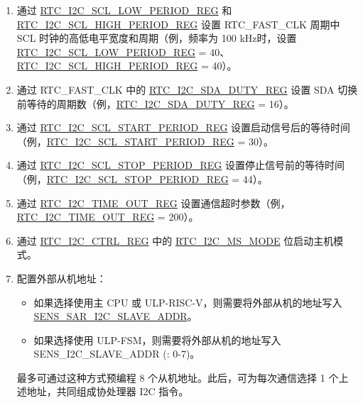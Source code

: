 \documentclass[main\_\_CN.tex]{subfiles}
\begin{document}
\begin{enumerate}
    \item 通过 \hyperref[fielddesc:RTCI2CSCLLOWPERIODREG]{RTC\_I2C\_SCL\_LOW\_PERIOD\_REG} 和 \hyperref[fielddesc:RTCI2CSCLHIGHPERIODREG]{RTC\_I2C\_SCL\_HIGH\_PERIOD\_REG} 设置 RTC\_FAST\_CLK 周期中 SCL 时钟的高低电平宽度和周期（例，频率为 100 kHz时，设置 \hyperref[fielddesc:RTCI2CSCLLOWPERIODREG]{RTC\_I2C\_SCL\_LOW\_PERIOD\_REG} = 40、 \hyperref[fielddesc:RTCI2CSCLHIGHPERIODREG]{RTC\_I2C\_SCL\_HIGH\_PERIOD\_REG} = 40）。

    \item 通过 RTC\_FAST\_CLK 中的 \hyperref[regdesc:RTCI2CSDADUTYREG]{RTC\_I2C\_SDA\_DUTY\_REG} 设置 SDA 切换前等待的周期数（例，\hyperref[regdesc:RTCI2CSDADUTYREG]{RTC\_I2C\_SDA\_DUTY\_REG} = 16）。

    \item 通过 \hyperref[regdesc:RTCI2CSCLSTARTPERIODREG]{RTC\_I2C\_SCL\_START\_PERIOD\_REG} 设置启动信号后的等待时间（例，\hyperref[regdesc:RTCI2CSCLSTARTPERIODREG]{RTC\_I2C\_SCL\_START\_PERIOD\_REG} = 30）。

    \item 通过 \hyperref[regdesc:RTCI2CSCLSTOPPERIODREG]{RTC\_I2C\_SCL\_STOP\_PERIOD\_REG} 设置停止信号前的等待时间（例，\hyperref[regdesc:RTCI2CSCLSTOPPERIODREG]{RTC\_I2C\_SCL\_STOP\_PERIOD\_REG} = 44）。

    \item 通过 \hyperref[fielddesc:RTCI2CTIMEOUTREG]{RTC\_I2C\_TIME\_OUT\_REG} 设置通信超时参数（例，\hyperref[fielddesc:RTCI2CTIMEOUTREG]{RTC\_I2C\_TIME\_OUT\_REG} = 200）。

    \item 通过 \hyperref[regdesc:RTCI2CCTRLREG]{RTC\_I2C\_CTRL\_REG} 中的 \hyperref[fielddesc:RTCI2CMSMODE]{RTC\_I2C\_MS\_MODE} 位启动主机模式。

    \item 配置外部从机地址：
    \begin{itemize}
        \item 如果选择使用主 CPU 或 ULP-RISC-V，则需要将外部从机的地址写入 \hyperref[fielddesc:SENSSARI2CSLAVEADDR]{SENS\_SAR\_I2C\_SLAVE\_ADDR}。
        \item 如果选择使用 ULP-FSM，则需要将外部从机的地址写入 SENS\_I2C\_SLAVE\_ADDR (: 0-7)。
    \end{itemize}
    最多可通过这种方式预编程 8 个从机地址。此后，可为每次通信选择 1 个上述地址，共同组成协处理器 I2C 指令。
\end{enumerate}
\end{document}
